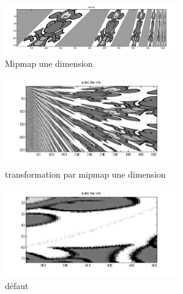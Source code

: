 \documentclass{article}
\begin{document}
\begin{figure}
\begin{center}
\includegraphics[width=75mm]{mipmap1d.jpg}
\end{center}
\caption{Mipmap une dimension}
\label{mipmap}
\end{figure}


\begin{figure}
\begin{center}
\includegraphics[width=75mm]{result.jpg}
\end{center}
\caption{transformation par mipmap une dimension}
\label{trans}
\end{figure}

\begin{figure}
\begin{center}
\includegraphics[width=75mm]{default.jpg}
\end{center}
\caption{défaut}
\label{def}
\end{figure}
\end{document}
